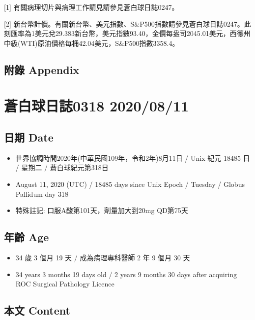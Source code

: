 \documentclass[a5paper, 11pt
]{book}
\providecommand{\tightlist}{%
  \setlength{\itemsep}{0pt}\setlength{\parskip}{0pt}}
\begin{document}
{[}1{]} 有關病理切片與病理工作請見請參見蒼白球日誌0247。

{[}2{]}
新台幣計價。有關新台幣、美元指數、S\&P500指數請參見蒼白球日誌0247。此刻匯率為1美元兌29.383新台幣，美元指數93.40，金價每盎司2045.01美元，西德州中級(WTI)原油價格每桶42.04美元，S\&P500指數3358.4。

\hypertarget{ux9644ux9304-appendix-61}{%
\subsection{附錄 Appendix}\label{ux9644ux9304-appendix-61}}

\hypertarget{ux84bcux767dux7403ux65e5ux8a8c0318-20200811}{%
\section{蒼白球日誌0318
2020/08/11}\label{ux84bcux767dux7403ux65e5ux8a8c0318-20200811}}

\hypertarget{ux65e5ux671f-date-62}{%
\subsection{日期 Date}\label{ux65e5ux671f-date-62}}

\begin{itemize}
\tightlist
\item
  世界協調時間2020年(中華民國109年，令和2年)8月11日 / Unix 紀元 18485 日
  / 星期二 / 蒼白球紀元第318日
\item
  August 11, 2020 (UTC) / 18485 days since Unix Epoch / Tuesday / Globus
  Pallidum day 318
\item
  特殊註記: 口服A酸第101天，劑量加大到20mg QD第75天
\end{itemize}

\hypertarget{ux5e74ux9f61-age-62}{%
\subsection{年齡 Age}\label{ux5e74ux9f61-age-62}}

\begin{itemize}
\tightlist
\item
  34 歲 3 個月 19 天 / 成為病理專科醫師 2 年 9 個月 30 天
\item
  34 years 3 months 19 days old / 2 years 9 months 30 days after
  acquiring ROC Surgical Pathology Licence
\end{itemize}

\hypertarget{ux672cux6587-content-62}{%
\subsection{本文 Content}\label{ux672cux6587-content-62}}
\end{document}
